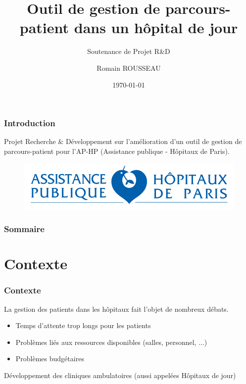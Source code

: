 \documentclass{beamer}
\title[Outil de gestion de parcours-patient]{Outil de gestion de parcours-patient dans un hôpital de jour}
\subtitle{Soutenance de Projet R\&D}
\author{Romain ROUSSEAU}
\date{\today}
\begin{document}
	
\begin{frame}[plain]
	\titlepage
\end{frame}


\begin{frame}[plain]
\frametitle{Introduction}

Projet Recherche \& Développement sur l'amélioration d'un outil de gestion de parcours-patient pour l'AP-HP (Assistance publique - Hôpitaux de Paris).

\begin{figure}
	\includegraphics[scale=0.7]{images/LOGO_APHP}
\end{figure}

\end{frame}


\begin{frame}

\frametitle{Sommaire}

\tableofcontents

\end{frame}

\section[Contexte]{Contexte}

\begin{frame}
\frametitle{Contexte}

La gestion des patients dans les hôpitaux fait l'objet de nombreux débats.

\bigbreak

\begin{itemize}
	\item Temps d'attente trop longs pour les patients
	\item Problèmes liés aux ressources disponibles (salles, personnel, ...) 
	\item Problèmes budgétaires
\end{itemize}

Développement des cliniques ambulatoires (aussi appelées Hôpitaux de jour)

\end{frame}
\end{document}
